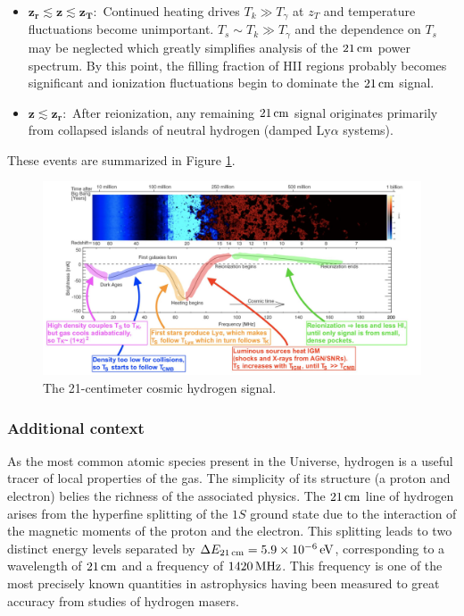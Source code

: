 \documentclass[a4paper,11pt]{article}
\begin{document}
\begin{itemize}
    \item $\mathbf{z_r\lesssim z\lesssim z_T:}$ Continued heating drives $T_k\gg T_\gamma$ at $z_T$ and temperature fluctuations become unimportant. $T_s\sim T_k\gg T_\gamma$ and the dependence on $T_s$ may be neglected which greatly simplifies analysis of the $21\,{\rm cm}$ power spectrum. By this point, the filling fraction of HII regions probably becomes significant and ionization fluctuations begin to dominate the $21\,{\rm cm}$ signal.
    \item $\mathbf{z\lesssim z_r:}$ After reionization, any remaining $21\,{\rm cm}$ signal originates primarily from collapsed islands of neutral hydrogen (damped Ly$\alpha$ systems).
\end{itemize}

{\noindent}These events are summarized in Figure \ref{fig:21cmannotated}.

\begin{figure}[t]
    \includegraphics[width=16cm]{figures/21cm_annotated.jpg}
    \centering
    \caption{\footnotesize{The 21-centimeter cosmic hydrogen signal.}}
    \label{fig:21cmannotated}
\end{figure}

\subsubsection{Additional context}

{\noindent}As the most common atomic species present in the Universe, hydrogen is a useful tracer of local properties of the gas. The simplicity of its structure (a proton and electron) belies the richness of the associated physics. The $21\,{\rm cm}$ line of hydrogen arises from the hyperfine splitting of the $1S$ ground state due to the interaction of the magnetic moments of the proton and the electron. This splitting leads to two distinct energy levels separated by $\Delta E_{21\,\mathrm{cm}}=5.9\times10^{-6}\,{\rm eV}$, corresponding to a wavelength of $21\,{\rm cm}$ and a frequency of $1420\,{\rm MHz}$. This frequency is one of the most precisely known quantities in astrophysics having been measured to great accuracy from studies of hydrogen masers.
\end{document}
